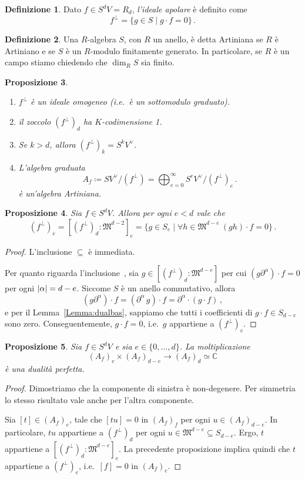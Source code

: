 \documentclass[a4paper, 11pt]{article}
\theoremstyle{definition}
\newtheorem{Def}{Definizione}[section]
\theoremstyle{plain}
\newtheorem{Prop}[Def]{Proposizione}
\DeclarePairedDelimiter{\abs}{\lvert}{\rvert}
\newcommand{\C}{\mathbb{C}}
\newcommand{\MM}{\mathfrak{M}}
\newcommand{\deff}{\coloneqq}
\begin{document}
\begin{Def}
	Dato $f \in S^d V = R_d$, \emph{l'ideale apolare} è definito come
	\[
		f^\bot = \{g \in S \mid g\cdot f = 0\}\,.
	\]
\end{Def}
\begin{Def}
	Una $R$-algebra $S$, con $R$ un anello, è detta Artiniana se $R$ è Artiniano e se $S$ è un $R$-modulo finitamente generato. In particolare, se $R$ è un campo stiamo chiedendo che $\dim_R S$ sia finito.
\end{Def}
\begin{Prop}
	\begin{enumerate}
		\item $f^\bot$ è un ideale omogeneo (i.e.\ è un sottomodulo graduato).
		\item il \emph{zoccolo} $(f^\bot)_d$ ha $K$-codimensione 1.
		\item Se $k > d$, allora $(f^\bot)_k = S^k V^\vee$.
		\item L'algebra graduata
		\[
			A_f \deff SV^\vee/(f^\bot) = \bigoplus_{e = 0}^\infty S^eV^\vee/(f^\bot)_e\,.
		\]
		è un'algebra Artiniana.
	\end{enumerate}
\end{Prop}
\begin{Prop}
	Sia $f \in S^d V$. Allora per ogni $e < d$ vale che
	\[
		(f^\bot)_e = [(f^\bot)_d \colon \MM^{d-2}]_e = \{g \in S_e \mid \forall h \in \MM^{d-e}\ (gh)\cdot f = 0\}\,.
	\]
\end{Prop}
\begin{proof}
	L'inclusione $\boxed{\subseteq}$ è immediata.
	
	Per quanto riguarda l'inclusione \boxed{\supseteq}\,, sia $g \in [(f^\bot)_d \colon \MM^{d-e}]$ per cui $(g\partial^\alpha) \cdot f = 0$ per ogni $\abs{\alpha} = d-e$. Siccome $S$ è un anello commutativo, allora
	\[
	(g\partial^\alpha)\cdot f = (\partial^\alpha\,g)\cdot f =  \partial^\alpha\cdot(g\cdot f)\,,
	\]
	e per il Lemma~\ref{Lemma:dualbas}, sappiamo che tutti i coefficienti di $g \cdot f \in S_{d-e}$ sono zero. Conseguentemente, $g \cdot f = 0$, i.e.\ $g$ appartiene a $(f^\bot)_e$.
\end{proof}
\begin{Prop}
	Sia $f \in S^d V$ e sia $e \in \{0,\dots, d\}$. La moltiplicazione 
	\[
		(A_f)_e \times (A_f)_{d-e} \to (A_f)_d \simeq \C
	\]
	è una dualità perfetta.
\end{Prop}
\begin{proof}
	Dimostriamo che la componente di sinistra è non-degenere. Per simmetria lo stesso risultato vale anche per l'altra componente.
	
	Sia $[t] \in (A_f)_e$, tale che $[tu] = 0$ in $(A_f)_f$ per ogni $u \in (A_f)_{d-e}$. In particolare, $tu$ appartiene a $(f^\bot)_d$ per ogni $u \in \MM^{d-e} \subseteq S_{d-e}$. Ergo, $t$ appartiene a $[(f^\bot)_d \colon \MM^{d-e}]_e$. La precedente proposizione implica quindi che $t$ appartiene a $(f^\bot)_e$, i.e.\ $[f] = 0$ in $(A_f)_e$.
\end{proof}
\end{document}
